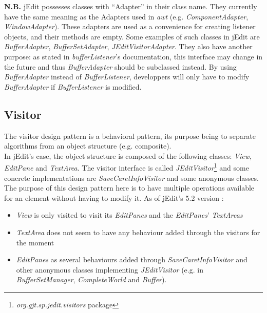 \begin{framehint2}
    \textbf{N.B.} jEdit possesses classes with ``Adapter'' in their class name.
    They currently have the same meaning as the Adapters used in \emph{awt}
    (e.g. \emph{ComponentAdapter}, \emph{WindowAdapter}).
    These adapters are used as a convenience for creating listener objects, and
    their methods are empty.
    Some examples of such classes in jEdit are \emph{BufferAdapter},
    \emph{BufferSetAdapter}, \emph{JEditVisitorAdapter}.
    They also have another purpose: as stated in \emph{bufferListener}'s
    documentation, this interface may change in the future and thus
    \emph{BufferAdapter} should be subclassed instead.
    By using \emph{BufferAdapter} instead of \emph{BufferListener}, developpers
    will only have to modify \emph{BufferAdapter} if \emph{BufferListener} is
    modified.
\end{framehint2}
\newpage

\subsection{Visitor}

The visitor design pattern is a behavioral pattern, its purpose being to
separate algorithms from an object structure (e.g. composite).\\

In jEdit's case, the object structure is composed of the following classes:
\emph{View}, \emph{EditPane} and \emph{TextArea}.
The visitor interface is called
\emph{JEditVisitor}\footnote{\emph{org.gjt.sp.jedit.visitors} package} and some
concrete implementations are \emph{SaveCaretInfoVisitor} and some anonymous
classes. The purpose of this design pattern here is to have multiple operations
available for an element without having to modify it. As of jEdit's 5.2 version :

\begin{itemize}\itemsep1pt
    \item  \emph{View} is only visited to visit its \emph{EditPanes} and the
    \emph{EditPanes}' \emph{TextAreas}
    \item \emph{TextArea} does not seem to have any behaviour added through the visitors for the moment
    \item \emph{EditPanes} as several behaviours added through
    \emph{SaveCaretInfoVisitor} and other anonymous classes implementing
    \emph{JEditVisitor} (e.g. in \emph{BufferSetManager}, \emph{CompleteWorld}
    and \emph{Buffer}).
\end{itemize}

